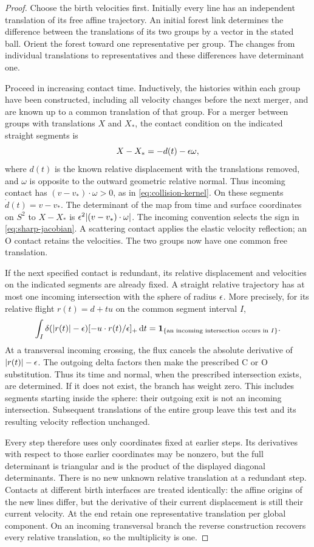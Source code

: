 \begin{proof}
Choose the birth velocities first.  Initially every line has an
independent translation of its free affine trajectory.  An initial
forest link determines the difference between the translations of its
two groups by a vector in the stated ball.  Orient the forest toward
one representative per group.  The changes from individual translations
to representatives and these differences have determinant one.

Proceed in increasing contact time.  Inductively, the histories within
each group have been constructed, including all velocity changes before
the next merger, and are known up to a common translation of that group.
For a merger between groups with translations \(X\) and \(X_*\), the
contact condition on the indicated straight segments is
\[
 X-X_*=-d(t)-\epsilon\omega,
\]
where \(d(t)\) is the known relative displacement with the translations
removed, and \(\omega\) is opposite to the outward geometric relative
normal.  Thus incoming contact has \((v-v_*)\cdot\omega>0\), as in
\eqref{eq:collision-kernel}.  On these segments
\(\dot d(t)=v-v_*\).  The determinant of
the map from time and surface coordinates on \(S^2\) to \(X-X_*\) is
\(\epsilon^2|(v-v_*)\cdot\omega|\).  The incoming convention selects the
sign in \eqref{eq:sharp-jacobian}.  A scattering contact applies the
elastic velocity reflection; an O contact retains the velocities.  The
two groups now have one common free translation.

If the next specified contact is redundant, its relative displacement
and velocities on the indicated segments are already fixed.  A straight
relative trajectory has at most one incoming intersection with the
sphere of radius \(\epsilon\).  More precisely, for its relative flight
\(r(t)=d+tu\) on the common segment interval \(I\),
\[
 \int_I\delta(|r(t)|-\epsilon)
       [-u\cdot r(t)/\epsilon]_+\,\mathrm d t
 =\mathbf 1_{\{\text{an incoming intersection occurs in }I\}}.
\]
At a transversal incoming crossing, the flux cancels the absolute
derivative of \(|r(t)|-\epsilon\).  The outgoing delta factors then make
the prescribed C or O substitution.  Thus its time and normal, when
the prescribed intersection exists, are determined.  If it does not exist, the branch
has weight zero.  This includes segments starting inside the sphere:
their outgoing exit is not an incoming intersection.  Subsequent
translations of the entire group leave this test and its resulting
velocity reflection unchanged.

Every step therefore uses only coordinates fixed at earlier steps.  Its
derivatives with respect to those earlier coordinates may be nonzero,
but the full determinant is triangular and is the product of the
displayed diagonal determinants.  There is no new unknown relative
translation at a redundant step.  Contacts at different birth interfaces
are treated identically: the affine origins of the new lines differ,
but the derivative of their current displacement is still their current
velocity.  At the end retain one representative translation per global
component.  On an incoming transversal branch the reverse construction
recovers every relative translation, so the multiplicity is one.


\end{proof}

